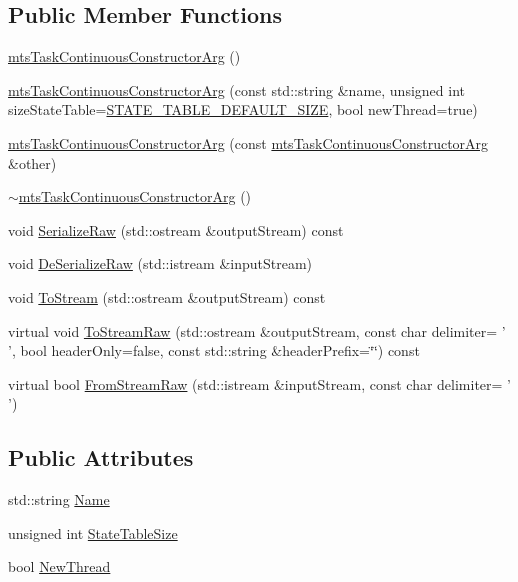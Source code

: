 \subsection*{Public Member Functions}
\begin{DoxyCompactItemize}
\item 
\hyperlink{classmts_task_continuous_constructor_arg_a44e7185a59526b7714965531eab9df14}{mts\-Task\-Continuous\-Constructor\-Arg} ()
\item 
\hyperlink{classmts_task_continuous_constructor_arg_ad2d6060a83c443b8121cda6e2103527c}{mts\-Task\-Continuous\-Constructor\-Arg} (const std\-::string \&name, unsigned int size\-State\-Table=\hyperlink{classmts_task_continuous_constructor_arg_ad66f44f9a55553807a393bcc75f4e672aa445b554da5472573538670101b0cc34}{S\-T\-A\-T\-E\-\_\-\-T\-A\-B\-L\-E\-\_\-\-D\-E\-F\-A\-U\-L\-T\-\_\-\-S\-I\-Z\-E}, bool new\-Thread=true)
\item 
\hyperlink{classmts_task_continuous_constructor_arg_a0941d5f66ab4cf88cfd864072ab92915}{mts\-Task\-Continuous\-Constructor\-Arg} (const \hyperlink{classmts_task_continuous_constructor_arg}{mts\-Task\-Continuous\-Constructor\-Arg} \&other)
\item 
\hyperlink{classmts_task_continuous_constructor_arg_a1e7e13d3202fe4186593d3699da1ff19}{$\sim$mts\-Task\-Continuous\-Constructor\-Arg} ()
\item 
void \hyperlink{classmts_task_continuous_constructor_arg_a271a5c201277963352d7e3e9dee08195}{Serialize\-Raw} (std\-::ostream \&output\-Stream) const 
\item 
void \hyperlink{classmts_task_continuous_constructor_arg_a75f78176e26f781eecbb0caf50ce40a6}{De\-Serialize\-Raw} (std\-::istream \&input\-Stream)
\item 
void \hyperlink{classmts_task_continuous_constructor_arg_adea556a3b4295fe124170b31c5c00a41}{To\-Stream} (std\-::ostream \&output\-Stream) const 
\item 
virtual void \hyperlink{classmts_task_continuous_constructor_arg_a2cdec03572448b0e6783ca3c07bf3b93}{To\-Stream\-Raw} (std\-::ostream \&output\-Stream, const char delimiter= ' ', bool header\-Only=false, const std\-::string \&header\-Prefix=\char`\"{}\char`\"{}) const 
\item 
virtual bool \hyperlink{classmts_task_continuous_constructor_arg_ae323bc20dc5d38d1d98a3abf2f6d5465}{From\-Stream\-Raw} (std\-::istream \&input\-Stream, const char delimiter= ' ')
\end{DoxyCompactItemize}
\subsection*{Public Attributes}
\begin{DoxyCompactItemize}
\item 
std\-::string \hyperlink{classmts_task_continuous_constructor_arg_a93d1c4dea258e4b415ecfc0d4a82d379}{Name}
\item 
unsigned int \hyperlink{classmts_task_continuous_constructor_arg_a45645886b95b25b5727488c7d335b2cf}{State\-Table\-Size}
\item 
bool \hyperlink{classmts_task_continuous_constructor_arg_aa49a5e6b6c0d56a38a87419604a40210}{New\-Thread}
\end{DoxyCompactItemize}


